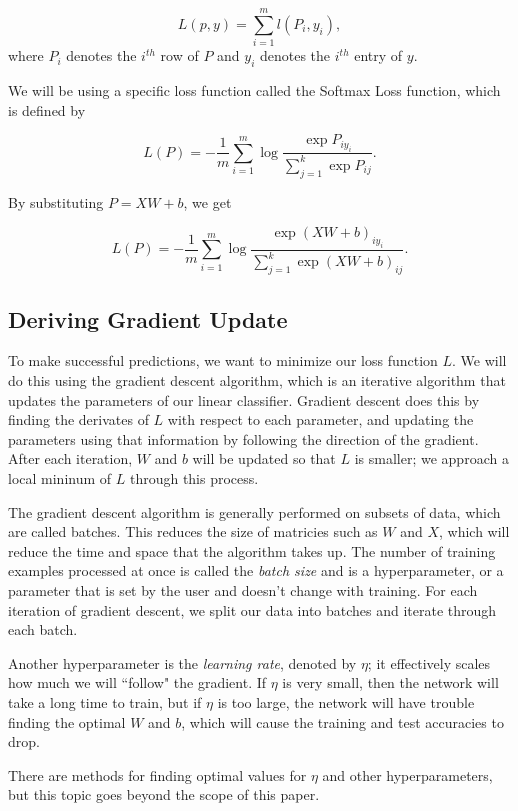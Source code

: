 \[
L(p, y) = \sum_{i=1}^m l(P_i, y_i),
\]
where $P_i$ denotes the $i^{th}$ row of $P$ and $y_i$ denotes the $i^{th}$
entry of $y$.

We will be using a specific loss function called the Softmax Loss function,
which is defined by

\[
L(P) = -\frac{1}{m} \sum_{i=1}^m \log \frac{\exp{P_{iy_i}}}
                                           {\sum_{j=1}^k \exp{P_{ij}}}.
\]

By substituting $P = XW + b$, we get

\[
L(P) = -\frac{1}{m} \sum_{i=1}^m \log
        \frac{\exp{\left(XW + b\right)_{iy_i}}}
             {\sum_{j=1}^k \exp{\left(XW + b\right)_{ij}}}.
\]

\subsection{Deriving Gradient Update}
To make successful predictions, we want to minimize our loss function $L$. We
will do this using the gradient descent algorithm, which is an iterative
algorithm that updates the parameters of our linear classifier. Gradient
descent does this by finding the derivates of $L$ with respect to each
parameter, and updating the parameters using that information by following the
direction of the gradient. After each iteration, $W$ and $b$ will be updated so
that $L$ is smaller; we approach a local mininum of $L$ through this process.

The gradient descent algorithm is generally performed on subsets of data, which
are called batches. This reduces the size of matricies such as $W$ and $X$,
which will reduce the time and space that the algorithm takes up. The number of
training examples processed at once is called the \textit{batch size} and is a
hyperparameter, or a parameter that is set by the user and doesn't change with
training. For each iteration of gradient descent, we split our data into
batches and iterate through each batch.

Another hyperparameter is the \textit{learning rate}, denoted by $\eta$; it
effectively scales how much we will ``follow" the gradient. If $\eta$ is
very small, then the network will take a long time to train, but if $\eta$ is
too large, the network will have trouble finding the optimal $W$ and $b$, which
will cause the training and test accuracies to drop.

\noindent There are methods for finding optimal values for $\eta$ and other
hyperparameters, but this topic goes beyond the scope of this paper.

